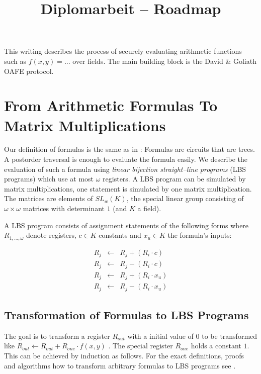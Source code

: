 \documentclass[12pt, a4paper]{article}
\title{Diplomarbeit -- Roadmap}
\begin{document}
\maketitle

This writing describes the process of securely evaluating arithmetic functions
such as $f(x,y) = ...$ over fields. The main building block is the David \&
Goliath OAFE protocol\cite{davidgoliath}.


\section{From Arithmetic Formulas To Matrix Multiplications}
\label{sec:FormulasToMatrixMuls}

Our definition of formulas is the same as in \cite{cleve91}: Formulas are
circuits that are trees. A postorder traversal is enough to evaluate the formula
easily. We describe the evaluation of such a formula using \emph{linear
bijection straight--line programs} (LBS programs)\cite{cleve91} which use at
most $\omega$ registers. A LBS program can be simulated by matrix
multiplications, one statement is simulated by one matrix multiplication. The
matrices are elements of $SL_w(K)$, the special linear group consisting of
$\omega \times \omega$ matrices with determinant $1$ (and $K$ a field).

A LBS program consists of assignment statements of the following
forms where $R_{1,...,\omega}$ denote registers, $c \in K$ constants and $x_u
\in K$ the formula's inputs:

\begin{eqnarray}
R_j & \leftarrow & R_j + (R_i \cdot c) \\
R_j & \leftarrow & R_j - (R_i \cdot c) \\
R_j & \leftarrow & R_j + (R_i \cdot x_u) \\
R_j & \leftarrow & R_j - (R_i \cdot x_u)
\end{eqnarray}


\subsection{Transformation of Formulas to LBS Programs}

The goal is to transform a register $R_{out}$ with a initial value of $0$ to be
transformed like $R_{out} \leftarrow R_{out} + R_{one} \cdot f(x,y)$ . The
special register $R_{one}$ holds a constant $1$. This can be achieved by
induction as follows.  For the exact definitions, proofs and algorithms how to
transform arbitrary formulas to LBS programs see \cite{cleve91}.
\end{document}
